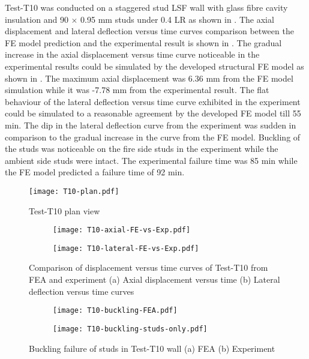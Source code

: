 Test-T10 was conducted on a staggered stud LSF wall with glass fibre cavity insulation and 90 $\times$ 0.95 mm studs under 0.4 LR as shown in . The axial displacement and lateral deflection versus time curves comparison between the FE model prediction and the experimental result is shown in . The gradual increase in the axial displacement versus time curve noticeable in the experimental results could be simulated by the developed structural FE model as shown in . The maximum axial displacement was 6.36 mm from the FE model simulation while it was -7.78 mm from the experimental result. The flat behaviour of the lateral deflection versus time curve exhibited in the experiment could be simulated to a reasonable agreement by the developed FE model till 55 min. The dip in the lateral deflection curve from the experiment was sudden in comparison to the gradual increase in the curve from the FE model. Buckling of the studs was noticeable on the fire side studs in the experiment while the ambient side studs were intact. The experimental failure time was 85 min while the FE model predicted a failure time of 92 min.
\begin{figure}[!htbp]
	\centering
			\texttt{[image: T10-plan.pdf]}\\
		\caption{Test-T10 plan view}
		\label{fig:T10-plan-FEA}
\end{figure}
\begin{figure}[!htbp]
	\centering
	\begin{subfigure}[b]{0.7\textwidth}
		\centering
		\texttt{[image: T10-axial-FE-vs-Exp.pdf]}
		\caption{}
		\label{subfig:T10-axial-FE-vs-Exp}
	\end{subfigure}
	\begin{subfigure}[b]{0.7\textwidth}
		\centering
		\texttt{[image: T10-lateral-FE-vs-Exp.pdf]}
		\caption{}
		\label{subfig:T10-lateral-FE-vs-Exp}
	\end{subfigure}
	   \caption{Comparison of displacement versus time curves of Test-T10 from FEA and experiment (a) Axial displacement versus time (b) Lateral deflection versus time curves}
	   \label{fig:T10-structural-FE-vs-Exp}
\end{figure}
\begin{figure}[!htbp]
	\centering
	\begin{subfigure}[b]{0.8\textwidth}
		\centering
		\texttt{[image: T10-buckling-FEA.pdf]}
		\caption{}
		\label{subfig:T10-buckling-FEA}
	\end{subfigure}
	\begin{subfigure}[b]{0.6\textwidth}
		\centering
		\texttt{[image: T10-buckling-studs-only.pdf]}
		\caption{}
		\label{subfig:T10-buckling-FEA-Exp}
	\end{subfigure}
	   \caption{Buckling failure of studs in Test-T10 wall (a) FEA (b) Experiment}
	   \label{fig:T10-buckling-FE-vs-Exp}
\end{figure} 


